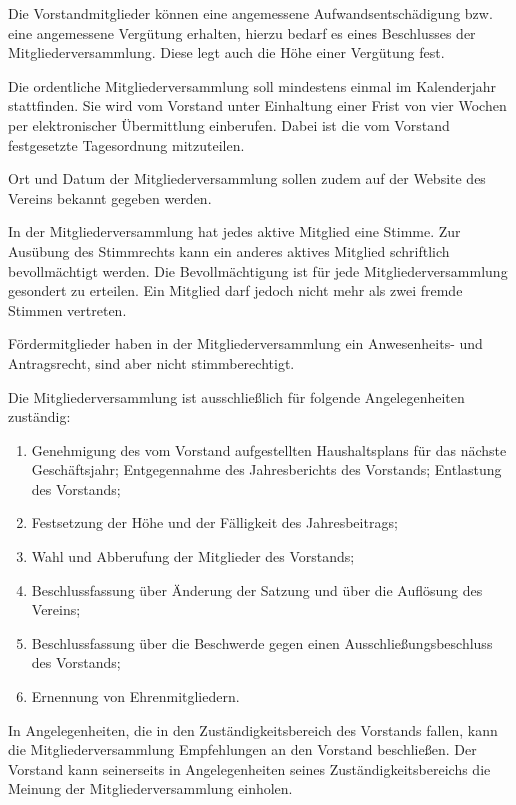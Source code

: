 \documentclass[parskip]{scrartcl}
\begin{document}
\begin{contract}
Die Vorstandmitglieder können eine angemessene Aufwandsentschädigung bzw. eine angemessene Vergütung erhalten, hierzu bedarf es eines Beschlusses der Mitgliederversammlung. Diese legt auch die Höhe einer Vergütung fest.


Die ordentliche Mitgliederversammlung soll mindestens einmal im Kalenderjahr stattfinden. Sie wird vom Vorstand unter Einhaltung einer Frist von vier Wochen per elektronischer Übermittlung einberufen. Dabei ist die vom Vorstand festgesetzte Tagesordnung mitzuteilen.

Ort und Datum der Mitgliederversammlung sollen zudem auf der Website des Vereins bekannt gegeben werden.


In der Mitgliederversammlung hat jedes aktive Mitglied eine Stimme. Zur Ausübung des Stimmrechts kann ein anderes aktives Mitglied schriftlich bevollmächtigt werden. Die Bevollmächtigung ist für jede Mitgliederversammlung gesondert zu erteilen. Ein Mitglied darf jedoch nicht mehr als zwei fremde Stimmen vertreten.

Fördermitglieder haben in der Mitgliederversammlung ein Anwesenheits- und Antragsrecht, sind aber nicht stimmberechtigt.

Die Mitgliederversammlung ist ausschließlich für folgende Angelegenheiten zuständig:

\begin{enumerate}
\item Genehmigung des vom Vorstand aufgestellten Haushaltsplans für das nächste Geschäftsjahr; Entgegennahme des Jahresberichts des Vorstands; Entlastung des Vorstands;
\item Festsetzung der Höhe und der Fälligkeit des Jahresbeitrags;
\item Wahl und Abberufung der Mitglieder des Vorstands;
\item Beschlussfassung über Änderung der Satzung und über die Auflösung des Vereins;
\item Beschlussfassung über die Beschwerde gegen einen Ausschließungsbeschluss des Vorstands;
\item Ernennung von Ehrenmitgliedern.
\end{enumerate}

In Angelegenheiten, die in den Zuständigkeitsbereich des Vorstands fallen, kann die Mitgliederversammlung Empfehlungen an den Vorstand beschließen. Der Vorstand kann seinerseits in Angelegenheiten seines Zuständigkeitsbereichs die Meinung der Mitgliederversammlung einholen.


\end{contract}
\end{document}
